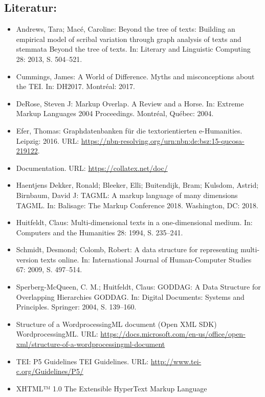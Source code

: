 \documentclass{article}
\begin{document}
        \subsection*{Literatur:}\begin{itemize}\item Andrews, Tara; Macé, Caroline: Beyond the tree of texts: Building an empirical model of
                              scribal variation through graph analysis of texts and stemmata Beyond the tree of texts. In: Literary and Linguistic Computing 28: 2013, S. 504–521.\item Cummings, James: A World of Difference. Myths and misconceptions about
                              the TEI. In: DH2017. Montréal: 2017.\item DeRose, Steven J: Markup Overlap. A Review and a Horse. In: Extreme Markup Languages 2004 Proceedings. Montréal, Québec: 2004.\item Efer, Thomas: Graphdatenbanken für die textorientierten
                              e-Humanities. Leipzig: 2016. URL: \url{https://nbn-resolving.org/urn:nbn:de:bsz:15-qucosa-219122}.\item Documentation. URL: \url{https://collatex.net/doc/}\item Haentjens Dekker, Ronald; Bleeker, Elli; Buitendijk, Bram; Kulsdom, Astrid; Birnbaum, David J: TAGML: A markup language of many dimensions TAGML. In: Balisage: The Markup Conference 2018. Washington, DC: 2018.\item Huitfeldt, Claus: Multi-dimensional texts in a one-dimensional
                              medium. In: Computers and the Humanities 28: 1994, S. 235–241.\item Schmidt, Desmond; Colomb, Robert: A data structure for representing multi-version texts
                              online. In: International Journal of Human-Computer Studies 67: 2009, S. 497–514.\item Sperberg-McQueen, C. M.; Huitfeldt, Claus: GODDAG: A Data Structure for Overlapping
                              Hierarchies GODDAG. In: Digital Documents: Systems and Principles. Springer: 2004, S. 139–160.\item Structure of a WordprocessingML document (Open XML
                              SDK) WordprocessingML. URL: \url{https://docs.microsoft.com/en-us/office/open-xml/structure-of-a-wordprocessingml-document}\item TEI: P5 Guidelines TEI Guidelines. URL: \url{http://www.tei-c.org/Guidelines/P5/}\item XHTML™ 1.0 The Extensible HyperText Markup Language

\end{itemize}
\end{document}
